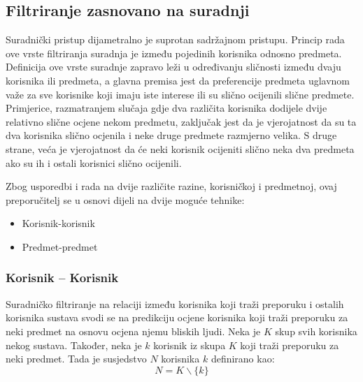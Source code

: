 \documentclass[times, utf8, diplomski, numeric]{fer}
\begin{document}
\subsection{Filtriranje zasnovano na suradnji}
Suradnički pristup dijametralno je suprotan sadržajnom pristupu. Princip rada
ove vrste filtriranja suradnja je između pojedinih korisnika odnosno predmeta.
Definicija ove vrste suradnje zapravo leži u određivanju sličnosti između dvaju
korisnika ili predmeta, a glavna premisa jest da preferencije predmeta uglavnom
važe za sve korisnike koji imaju iste interese ili su slično ocijenili slične
predmete. Primjerice, razmatranjem slučaja gdje dva različita korisnika dodijele
dvije relativno slične ocjene nekom predmetu, zaključak jest da je vjerojatnost
da su ta dva korisnika slično ocjenila i neke druge predmete razmjerno velika. S
druge strane, veća je vjerojatnost da će neki korisnik ocijeniti slično neka dva
predmeta ako su ih i ostali korisnici slično ocijenili.

Zbog usporedbi i rada na dvije različite razine, korisničkoj i predmetnoj, ovaj
preporučitelj se u osnovi dijeli na dvije moguće tehnike:
\begin{itemize}
  \item Korisnik-korisnik 
  \item Predmet-predmet 
\end{itemize}

\subsubsection{Korisnik -- Korisnik}
Suradničko filtriranje na relaciji između korisnika koji traži preporuku i
ostalih korisnika sustava svodi se na predikciju ocjene korisnika koji traži
preporuku za neki predmet na osnovu ocjena njemu bliskih ljudi. Neka je $K$ skup
svih korisnika nekog sustava. Također, neka je $k$ korisnik iz skupa $K$ koji
traži preporuku za neki predmet. Tada je susjedstvo $N$ korisnika $k$
definirano kao:
\begin{equation}
\label{eq:susjedstvo}
	N = K \backslash \{k\}
\end{equation}
\end{document}
